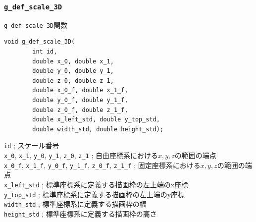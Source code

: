 \documentclass[platex,a4paper,12pt]{jsarticle}%
\begin{document}
\clearpage
\subsubsection{\texttt{g\_def\_scale\_3D}}
\label{g_def_scale_3D}

\begin{itembox}[l]{\texttt{g\_def\_scale\_3D}関数}
\begin{verbatim}
void g_def_scale_3D(
        int id,
        double x_0, double x_1,
        double y_0, double y_1,
        double z_0, double z_1,
        double x_0_f, double x_1_f, 
        double y_0_f, double y_1_f, 
        double z_0_f, double z_1_f, 
        double x_left_std, double y_top_std,
        double width_std, double height_std);
\end{verbatim}
\verb|id| ; スケール番号 \\
\verb|x_0|, \verb|x_1|, \verb|y_0|, \verb|y_1|, \verb|z_0|, \verb|z_1| ; 自由座標系における$x, y, z$の範囲の端点 \\
\verb|x_0_f|, \verb|x_1_f|, \verb|y_0_f|, \verb|y_1_f|, \verb|z_0_f|, \verb|z_1_f| ; 固定座標系における$x, y, z$の範囲の端点 \\
\verb|x_left_std| ; 標準座標系に定義する描画枠の左上端のx座標 \\
\verb|y_top_std| ; 標準座標系に定義する描画枠の左上端のy座標 \\
\verb|width_std| ; 標準座標系に定義する描画枠の幅 \\
\verb|height_std| ; 標準座標系に定義する描画枠の高さ
\end{itembox}
\end{document}
